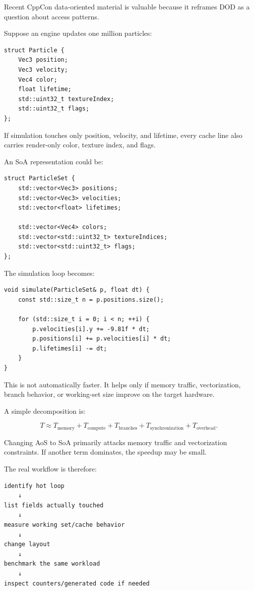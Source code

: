 Recent CppCon data-oriented material is valuable because it reframes DOD as a question about access patterns.

Suppose an engine updates one million particles:

\begin{verbatim}
struct Particle {
    Vec3 position;
    Vec3 velocity;
    Vec4 color;
    float lifetime;
    std::uint32_t textureIndex;
    std::uint32_t flags;
};
\end{verbatim}

If simulation touches only position, velocity, and lifetime, every cache line also carries render-only color, texture index, and flags.

An SoA representation could be:

\begin{verbatim}
struct ParticleSet {
    std::vector<Vec3> positions;
    std::vector<Vec3> velocities;
    std::vector<float> lifetimes;

    std::vector<Vec4> colors;
    std::vector<std::uint32_t> textureIndices;
    std::vector<std::uint32_t> flags;
};
\end{verbatim}

The simulation loop becomes:

\begin{verbatim}
void simulate(ParticleSet& p, float dt) {
    const std::size_t n = p.positions.size();

    for (std::size_t i = 0; i < n; ++i) {
        p.velocities[i].y += -9.81f * dt;
        p.positions[i] += p.velocities[i] * dt;
        p.lifetimes[i] -= dt;
    }
}
\end{verbatim}

This is not automatically faster. It helps only if memory traffic, vectorization, branch behavior, or working-set size improve on the target hardware.

A simple decomposition is:

\[
T
\approx
T_{\text{memory}}
+
T_{\text{compute}}
+
T_{\text{branches}}
+
T_{\text{synchronization}}
+
T_{\text{overhead}}.
\]

Changing AoS to SoA primarily attacks memory traffic and vectorization constraints. If another term dominates, the speedup may be small.

The real workflow is therefore:

\begin{verbatim}
identify hot loop
    ↓
list fields actually touched
    ↓
measure working set/cache behavior
    ↓
change layout
    ↓
benchmark the same workload
    ↓
inspect counters/generated code if needed
\end{verbatim}

